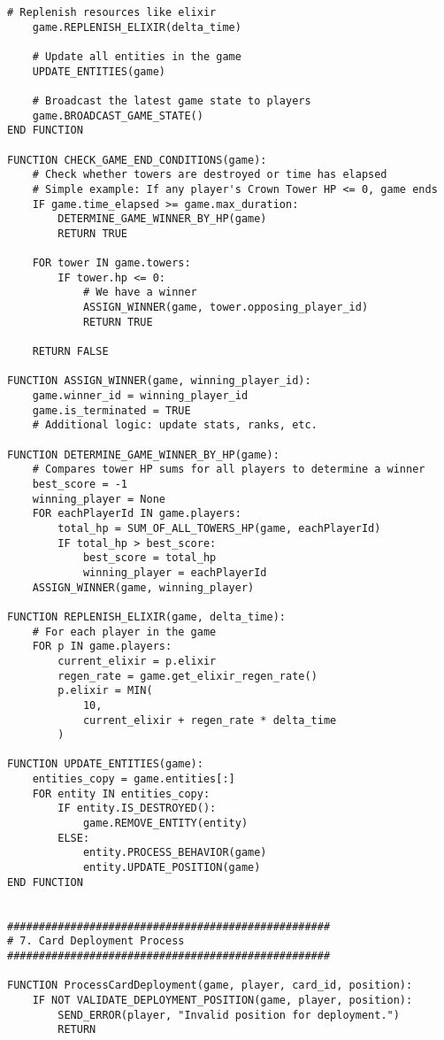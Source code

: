 \documentclass{article}
\begin{document}
\begin{lstlisting}[style=pseudo]
    # Replenish resources like elixir
    game.REPLENISH_ELIXIR(delta_time)

    # Update all entities in the game
    UPDATE_ENTITIES(game)

    # Broadcast the latest game state to players
    game.BROADCAST_GAME_STATE()
END FUNCTION

FUNCTION CHECK_GAME_END_CONDITIONS(game):
    # Check whether towers are destroyed or time has elapsed
    # Simple example: If any player's Crown Tower HP <= 0, game ends
    IF game.time_elapsed >= game.max_duration:
        DETERMINE_GAME_WINNER_BY_HP(game)
        RETURN TRUE

    FOR tower IN game.towers:
        IF tower.hp <= 0:
            # We have a winner
            ASSIGN_WINNER(game, tower.opposing_player_id)
            RETURN TRUE

    RETURN FALSE

FUNCTION ASSIGN_WINNER(game, winning_player_id):
    game.winner_id = winning_player_id
    game.is_terminated = TRUE
    # Additional logic: update stats, ranks, etc.

FUNCTION DETERMINE_GAME_WINNER_BY_HP(game):
    # Compares tower HP sums for all players to determine a winner
    best_score = -1
    winning_player = None
    FOR eachPlayerId IN game.players:
        total_hp = SUM_OF_ALL_TOWERS_HP(game, eachPlayerId)
        IF total_hp > best_score:
            best_score = total_hp
            winning_player = eachPlayerId
    ASSIGN_WINNER(game, winning_player)

FUNCTION REPLENISH_ELIXIR(game, delta_time):
    # For each player in the game
    FOR p IN game.players:
        current_elixir = p.elixir
        regen_rate = game.get_elixir_regen_rate()
        p.elixir = MIN(
            10, 
            current_elixir + regen_rate * delta_time
        )

FUNCTION UPDATE_ENTITIES(game):
    entities_copy = game.entities[:]
    FOR entity IN entities_copy:
        IF entity.IS_DESTROYED():
            game.REMOVE_ENTITY(entity)
        ELSE:
            entity.PROCESS_BEHAVIOR(game)
            entity.UPDATE_POSITION(game)
END FUNCTION


###################################################
# 7. Card Deployment Process
###################################################

FUNCTION ProcessCardDeployment(game, player, card_id, position):
    IF NOT VALIDATE_DEPLOYMENT_POSITION(game, player, position):
        SEND_ERROR(player, "Invalid position for deployment.")
        RETURN


\end{lstlisting}
\end{document}
